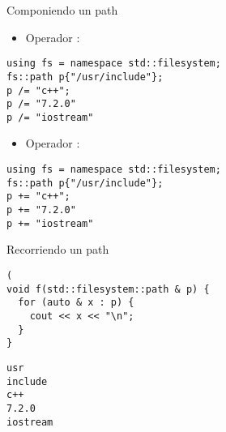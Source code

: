 \begin{frame}[t,fragile]{Componiendo un path}
\begin{itemize}
  \item Operador \cppkey{/=}:
\end{itemize}
\begin{lstlisting}
using fs = namespace std::filesystem;
fs::path p{"/usr/include"};
p /= "c++";
p /= "7.2.0"
p /= "iostream"
\end{lstlisting}

\vfill\pause
\begin{itemize}
  \item Operador \cppkey{+=}:
\end{itemize}
\begin{lstlisting}
using fs = namespace std::filesystem;
fs::path p{"/usr/include"};
p += "c++";
p += "7.2.0"
p += "iostream"
\end{lstlisting}
\end{frame}

\begin{frame}[t,fragile]{Recorriendo un path}
\begin{lstlisting}(
void f(std::filesystem::path & p) {
  for (auto & x : p) {
    cout << x << "\n";
  }
}
\end{lstlisting}

\begin{lstlisting}[style=terminal]
usr
include
c++
7.2.0
iostream
\end{lstlisting}
\end{frame}

